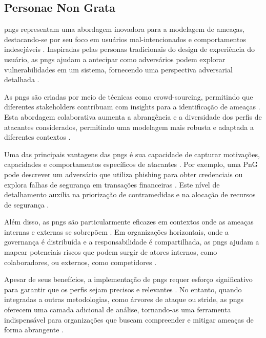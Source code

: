 \subsection{Personae Non Grata}
\label{subsec:personae_non_grata}

\gls{pngs} representam uma abordagem inovadora para a
modelagem de ameaças, destacando-se por seu foco em usuários
mal-intencionados e comportamentos indesejáveis
\cite{PersonaeNonGratae}. Inspiradas pelas personas tradicionais do
design de experiência do usuário, as \gls{pngs} ajudam a antecipar como
adversários podem explorar vulnerabilidades em um sistema, fornecendo
uma perspectiva adversarial detalhada
\cite{PnGRequirementsPhaseThreatModeling}.

As \gls{pngs} são criadas por meio de técnicas como crowd-sourcing,
permitindo que diferentes stakeholders contribuam com insights para a
identificação de ameaças \cite{PnGRequirementsPhaseThreatModeling}.
Esta abordagem colaborativa aumenta a abrangência e a diversidade dos
perfis de atacantes considerados, permitindo uma modelagem mais
robusta e adaptada a diferentes contextos \cite{PersonaeNonGratae}.

Uma das principais vantagens das \gls{pngs} é sua capacidade de capturar
motivações, capacidades e comportamentos específicos de atacantes
\cite{PnGRequirementsPhaseThreatModeling}.
Por exemplo, uma PnG pode descrever um adversário que utiliza phishing
para obter credenciais ou explora falhas de segurança em transações
financeiras \cite{PersonaeNonGratae}. Este nível de detalhamento
auxilia na priorização de contramedidas e na alocação de recursos de
segurança \cite{PnGRequirementsPhaseThreatModeling}.

Além disso, as \gls{pngs} são particularmente eficazes em contextos onde as
ameaças internas e externas se sobrepõem \cite{PersonaeNonGratae}.
Em organizações horizontais, onde a governança é distribuída
e a responsabilidade é compartilhada, as \gls{pngs} ajudam
a mapear potenciais riscos que podem surgir de atores
internos, como colaboradores, ou externos, como competidores
\cite{PersonaeNonGratae}.

Apesar de seus benefícios, a implementação de \gls{pngs} requer esforço
significativo para garantir que os perfis sejam precisos e relevantes
\cite{PnGRequirementsPhaseThreatModeling}.
No entanto, quando integradas a outras metodologias, como árvores de
ataque ou \gls{stride}, as \gls{pngs} oferecem uma camada adicional de análise,
tornando-as uma ferramenta indispensável para organizações que buscam
compreender e mitigar ameaças de forma abrangente
\cite{PnGRequirementsPhaseThreatModeling}.

